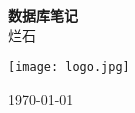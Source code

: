 \documentclass[UTF8,a4paper,12pt,autoindent=true,fontset=none,zihao=-4,scheme=chinese,space=auto]{ctexart}
\begin{document}
\begin{titlepage}
    \centering %
    \vspace{2cm} %
    {\Huge \textbf{数据库笔记}} \\
    \vspace{1.5cm}
    {\Large 烂石} \\
    \vspace{2cm}
    \begin{flushleft}
        \centering %
        \texttt{[image: logo.jpg]} %
    \end{flushleft}
    \vfill
    {\large \today}
\end{titlepage}












\end{document}
